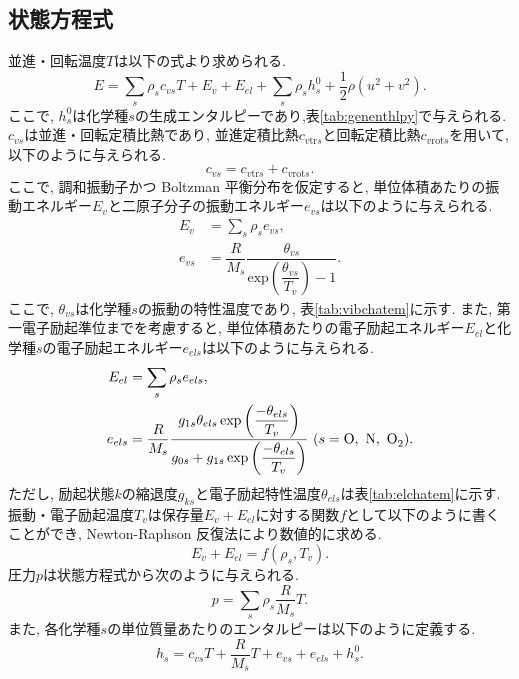 \subsection*{状態方程式}
並進・回転温度$T$は以下の式より求められる.
\begin{equation}
E=\sum_{s}\rho_{s}c_{vs}T+E_{v}+E_{el}+\sum_{s}\rho_{s}h^{0}_{s}+\dfrac{1}{2}\rho(u^{2}+v^{2}).
\end{equation}
ここで,
$h^{0}_{s}$は化学種$s$の生成エンタルピーであり,表\ref{tab:genenthlpy}で与えられる.
$c_{vs}$は並進・回転定積比熱であり,
並進定積比熱$c_{v\mathrm{tr}s}$と回転定積比熱$c_{v\mathrm{rot}s}$を用いて,
以下のように与えられる.
\begin{equation}
c_{vs}=c_{v\mathrm{tr}s}+c_{v\mathrm{rot}s}.
\end{equation}
ここで,
調和振動子かつ Boltzman 平衡分布を仮定すると,
単位体積あたりの振動エネルギー$E_v$と二原子分子の振動エネルギー$e_{vs}$は以下のように与えられる.
\begin{align}
E_v&=\sum_{s}\rho_{s}e_{vs},\\
e_{vs}&=\dfrac{R}{M_s}\dfrac{\theta_{vs}}{\mathrm{exp} \left( \dfrac{\theta_{vs}}{T_v} \right) -1}.
\end{align}
ここで,
$\theta_{vs}$は化学種$s$の振動の特性温度であり,
表\ref{tab:vibchatem}に示す.
また,
第一電子励起準位までを考慮すると,
単位体積あたりの電子励起エネルギー$E_{el}$と化学種$s$の電子励起エネルギー$e_{els}$は以下のように与えられる.
\begin{align}
E_{el}&=\sum_{s}\rho_{s}e_{els},\\
e_{els}&=\dfrac{R}{M_s}\dfrac{g_{1s}\theta_{els}\exp \left( \dfrac{-\theta_{els}}{T_v} \right) }{ g_{0s}+g_{1s}\exp\left( \dfrac{-\theta_{els}}{T_v} \right) }~(s=\ce{O},\ \ce{N},\ \ce{O2}).
\end{align}
ただし,
励起状態$k$の縮退度$g_{ks}$と電子励起特性温度$\theta_{els}$は表\ref{tab:elchatem}に示す.
振動・電子励起温度$T_v$は保存量$E_v+E_{el}$に対する関数$f$として以下のように書くことができ,
Newton-Raphson 反復法により数値的に求める.
\begin{equation}
E_{v}+E_{el}=f(\rho_s,T_v).
\end{equation}
圧力$p$は状態方程式から次のように与えられる.
\begin{equation}
p=\sum_{s}\rho_s\dfrac{R}{M_s}T.
\end{equation}
また,
各化学種$s$の単位質量あたりのエンタルピーは以下のように定義する.
\begin{equation}
h_s=c_{vs}T+\dfrac{R}{M_s}T+e_{vs}+e_{els}+h^{0}_{s}.
\end{equation}


